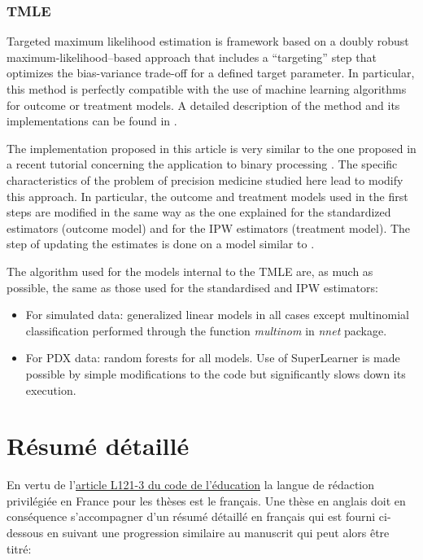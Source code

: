 \documentclass[a4paper,12pt,twoside,onecolumn,openright,final,oldfontcommands]{memoir}
\providecommand{\tightlist}{%
  \setlength{\itemsep}{0pt}\setlength{\parskip}{0pt}}
\begin{document}
\subsection{TMLE}\label{appendix-TMLE}

Targeted maximum likelihood estimation is framework based on a doubly
robust maximum-likelihood--based approach that includes a ``targeting''
step that optimizes the bias-variance trade-off for a defined target
parameter. In particular, this method is perfectly compatible with the
use of machine learning algorithms for outcome or treatment models. A
detailed description of the method and its implementations can be found
in \citet{van2011targeted}.

The implementation proposed in this article is very similar to the one
proposed in a recent tutorial concerning the application to binary
processing \citep{luque2018targeted}. The specific characteristics of
the problem of precision medicine studied here lead to modify this
approach. In particular, the outcome and treatment models used in the
first steps are modified in the same way as the one explained for the
standardized estimators (outcome model) and for the IPW estimators
(treatment model). The step of updating the estimates is done on a model
similar to \citet{luque2018targeted}.

The algorithm used for the models internal to the TMLE are, as much as
possible, the same as those used for the standardised and IPW
estimators:

\begin{itemize}
\tightlist
\item
  For simulated data: generalized linear models in all cases except
  multinomial classification performed through the function
  \emph{multinom} in \emph{nnet} package.
\item
  For PDX data: random forests for all models. Use of SuperLearner
  \citep{van2007super} is made possible by simple modifications to the
  code but significantly slows down its execution.
\end{itemize}

\chapter{Résumé détaillé}\label{ruxe9sumuxe9-duxe9tailluxe9}

En vertu de
l'\href{https://www.legifrance.gouv.fr/affichCodeArticle.do?idArticle=LEGIARTI000006524389\&cidTexte=LEGITEXT000006071191}{article
L121-3 du code de l'éducation} la langue de rédaction privilégiée en
France pour les thèses est le français. Une thèse en anglais doit en
conséquence s'accompagner d'un résumé détaillé en français qui est
fourni ci-dessous en suivant une progression similaire au manuscrit qui
peut alors être titré:
\end{document}
